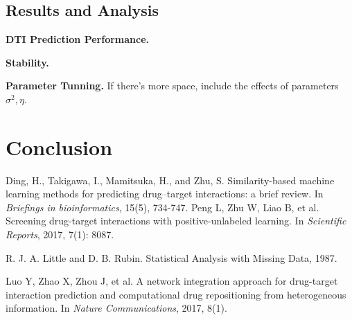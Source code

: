 \documentclass[sigconf,anonymous]{acmart}
\begin{document}
\subsection{Results and Analysis}
\textbf{DTI Prediction Performance.}

\textbf{Stability.}

\textbf{Parameter Tunning.} If there's more space, include the effects of parameters $\sigma^2,\eta$.

\section{Conclusion}\label{sec:conclusion}


\begin{thebibliography}{10}
Ding, H., Takigawa, I., Mamitsuka, H., and Zhu, S.
\newblock Similarity-based machine learning methods for predicting drug–target interactions: a brief review. \newblock In {\em Briefings in bioinformatics}, 15(5), 734-747.
Peng L, Zhu W, Liao B, et al.
\newblock Screening drug-target interactions with positive-unlabeled learning.
\newblock In {\em Scientific Reports}, 2017, 7(1): 8087.

R. J. A. Little and D. B. Rubin.
\newblock Statistical Analysis with Missing Data, 1987.

Luo Y, Zhao X, Zhou J, et al.
\newblock A network integration approach for drug-target interaction prediction and computational drug repositioning from heterogeneous information.
\newblock In {\em Nature Communications}, 2017, 8(1).

%
%
%
\end{thebibliography}
\end{document}
